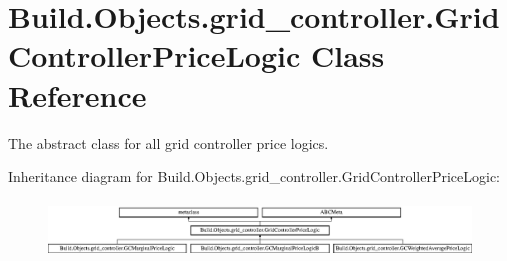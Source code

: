 \hypertarget{class_build_1_1_objects_1_1grid__controller_1_1_grid_controller_price_logic}{}\section{Build.\+Objects.\+grid\+\_\+controller.\+Grid\+Controller\+Price\+Logic Class Reference}
\label{class_build_1_1_objects_1_1grid__controller_1_1_grid_controller_price_logic}


The abstract class for all grid controller price logics.  


Inheritance diagram for Build.\+Objects.\+grid\+\_\+controller.\+Grid\+Controller\+Price\+Logic\+:\begin{figure}[H]
\begin{center}
\leavevmode
\includegraphics[height=1.530055cm]{class_build_1_1_objects_1_1grid__controller_1_1_grid_controller_price_logic}
\end{center}
\end{figure}
